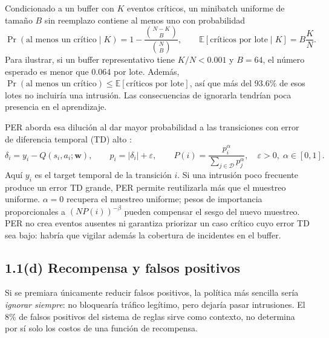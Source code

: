 \documentclass[11pt,a4paper]{article}
\begin{document}
Condicionado a un buffer con $K$ eventos críticos, un minibatch uniforme de tamaño $B$ sin reemplazo contiene al menos uno con probabilidad
\begin{equation}
 \Pr(\text{al menos un crítico}\mid K)
 =1-\frac{\binom{N-K}{B}}{\binom{N}{B}},
 \qquad \mathbb E[\text{críticos por lote}\mid K]=B\frac{K}{N}.
\end{equation}
Para ilustrar, si un buffer representativo tiene $K/N<0.001$ y $B=64$, el número esperado es menor que $0.064$ por lote. Además, $\Pr(\text{al menos un crítico})\leq\mathbb E[\text{críticos por lote}]$, así que más del $93.6\%$ de esos lotes no incluiría una intrusión. Las consecuencias de ignorarla tendrían poca presencia en el aprendizaje.

PER aborda esa dilución al dar mayor probabilidad a las transiciones con error de diferencia temporal (TD) alto \cite{diapositivas}:
\begin{equation}
 \delta_i=y_i-Q(s_i,a_i;\mathbf{w}),\qquad
 p_i=|\delta_i|+\varepsilon,\qquad
 P(i)=\frac{p_i^{\alpha}}{\sum_{j\in\mathcal D}p_j^{\alpha}},
 \quad \varepsilon>0,\;\alpha\in[0,1].
\end{equation}
Aquí $y_i$ es el target temporal de la transición $i$. Si una intrusión poco frecuente produce un error TD grande, PER permite reutilizarla más que el muestreo uniforme. $\alpha=0$ recupera el muestreo uniforme; pesos de importancia proporcionales a $(NP(i))^{-\beta}$ pueden compensar el sesgo del nuevo muestreo. PER no crea eventos ausentes ni garantiza priorizar un caso crítico cuyo error TD sea bajo: habría que vigilar además la cobertura de incidentes en el buffer.

\subsection*{1.1(d) Recompensa y falsos positivos}
Si se premiara únicamente reducir falsos positivos, la política más sencilla sería \emph{ignorar siempre}: no bloquearía tráfico legítimo, pero dejaría pasar intrusiones. El 8\% de falsos positivos del sistema de reglas sirve como contexto, no determina por sí solo los costos de una función de recompensa.
\end{document}
